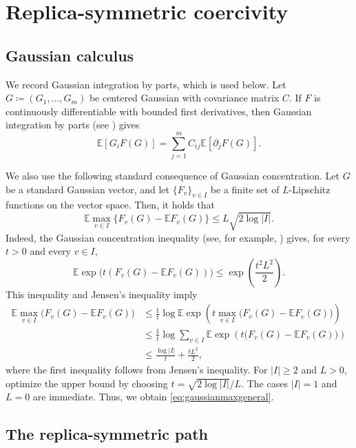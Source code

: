 \documentclass[11pt]{article}
\numberwithin{equation}{section}
\newcommand{\E}{\mathbb{E}}
\newcommand{\1}{\mathbf 1}
\begin{document}
\section{Replica-symmetric coercivity}\label{sec:coercivity}

\subsection{Gaussian calculus}\label{subsec:gaussian}

We record Gaussian integration by parts, which is used below.  Let
$G\coloneqq(G_1,\ldots,G_m)$ be centered Gaussian with covariance
matrix $C$.
If $F$ is continuously differentiable with bounded first derivatives,
then Gaussian integration by parts (see \cite[Vol. 1, Sec. A.4]{Talagrand}) gives
\begin{equation}
 \E[G_iF(G)]=\sum_{j=1}^m C_{ij}\E[\partial_jF(G)].
 \label{eq:GIBP}
\end{equation}

We also use the following standard consequence of Gaussian concentration.
Let \(G\) be a standard Gaussian vector, and let $\{ F_v\} _{v\in I}$ be a finite set of $L$-Lipschitz functions on the vector space.
Then, it holds that
\begin{equation}
 \E\max_{v\in I}\{F_v (G) -\E F_v (G)\}
 \le L\sqrt{2\log|I|}.
 \label{eq:gaussianmaxgeneral}
\end{equation}
Indeed, the Gaussian concentration inequality (see, for example,
\cite{Ledoux}) gives, for every \(t>0\)
and every \(v\in I\),
\[
 \E\exp\bigl(t(F_v(G) -\E F_v (G))\bigr)
 \le \exp\left(\frac{t^2L^2}{2}\right).
\]
This inequality and Jensen's inequality imply
\[ \begin{aligned}
\E\max_{v\in I}\bigl(F_v(G)-\E F_v(G)\bigr) &\le \frac1t\log \E\exp\left( t\max_{v\in I}\bigl(F_v(G)-\E F_v(G)\bigr) \right)\\ &\le \frac1t\log \sum_{v\in I} \E\exp\left(t\bigl(F_v(G)-\E F_v(G)\bigr)\right)\\
&\le \frac{\log|I|}{t}+\frac{tL^2}{2}, \end{aligned} \] 
where the first inequality follows from Jensen's inequality. 
For $|I|\ge2$ and $L>0$, optimize the upper bound by choosing
$t=\sqrt{2\log|I|}/L$.  The cases $|I|=1$ and $L=0$ are immediate.
Thus, we obtain \eqref{eq:gaussianmaxgeneral}.

\subsection{The replica-symmetric path}\label{subsec:ATsign}
\end{document}

